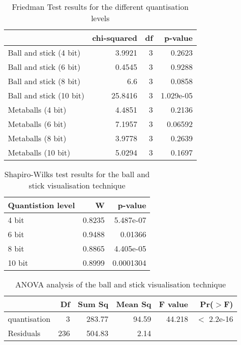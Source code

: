 \begin{table}
  \begin{tabular}{ | l | r | r | r | }
  \hline
                          & chi-squared & df &    p-value  \\ \hline
  Ball and stick (4 bit)  &      3.9921 &  3 &     0.2623  \\ \hline
  Ball and stick (6 bit)  &      0.4545 &  3 &     0.9288  \\ \hline
  Ball and stick (8 bit)  &         6.6 &  3 &     0.0858  \\ \hline
  Ball and stick (10 bit) &     25.8416 &  3 &  1.029e-05  \\ \hline
  Metaballs (4 bit)       &      4.4851 &  3 &     0.2136  \\ \hline
  Metaballs (6 bit)       &      7.1957 &  3 &    0.06592  \\ \hline
  Metaballs (8 bit)       &      3.9778 &  3 &     0.2639  \\ \hline
  Metaballs (10 bit)      &      5.0294 &  3 &     0.1697  \\ \hline
  \end{tabular}
  \caption{Friedman Test results for the different quantisation levels}
  \label{tab:appendix_dataset_friedman}
\end{table}


\begin{table}
  \begin{tabular}{ | l | r | r | }
  \hline
  Quantistion level &      W &   p-value  \\ \hline
  4 bit             & 0.8235 & 5.487e-07  \\ \hline
  6 bit             & 0.9488 &   0.01366  \\ \hline
  8 bit             & 0.8865 & 4.405e-05  \\ \hline
  10 bit            & 0.8999 & 0.0001304  \\ \hline
  \end{tabular}
  \caption{Shapiro-Wilks test results for the ball and stick visualisation
  technique}
  \label{tab:appendix_ballstick_normality}
\end{table}


\begin{table}
  \begin{tabular}{ | l | r | r | r | r | r | }
  \hline
               &  Df & Sum Sq & Mean Sq & F value &   Pr($>$F)   \\ \hline
  quantisation &   3 & 283.77 &   94.59 &  44.218 & $<$ 2.2e-16  \\ \hline
  Residuals    & 236 & 504.83 &    2.14 &         &              \\ \hline
  \end{tabular}
  \caption{ANOVA analysis of the ball and stick visualisation technique}
  \label{tab:appendix_ballstick_anova}
\end{table}



